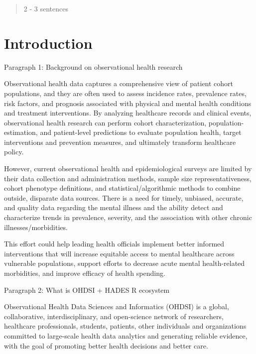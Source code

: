 \documentclass{juliacon}
\begin{document}


\maketitle

\begin{abstract}

2 - 3 sentences

\end{abstract}

\section{Introduction}

Paragraph 1: Background on observational health research

Observational health data captures a comprehensive view of patient cohort populations, and they are often used to assess incidence rates, prevalence rates, risk factors, and prognosis associated with physical and mental health conditions and treatment interventions. By analyzing healthcare records and clinical events, observational health research can perform cohort characterization, population-estimation, and patient-level predictions to evaluate population health, target interventions and prevention measures, and ultimately transform healthcare policy.    

However, current observational health and epidemiological surveys are limited by their data collection and administration methods, sample size representativeness, cohort phenotype definitions, and statistical/algorithmic methods to combine outside, disparate data sources. There is a need for timely, unbiased, accurate, and quality data regarding the mental illness and the ability detect and characterize trends in prevalence, severity, and the association with other chronic illnesses/morbidities. 

This effort could help leading health officials implement better informed interventions that will increase equitable access to mental healthcare across vulnerable populations, support efforts to decrease acute mental health-related morbidities, and improve efficacy of health spending. 

Paragraph 2: What is OHDSI + HADES R ecosystem

Observational Health Data Sciences and Informatics (OHDSI) is a global, collaborative, interdisciplinary, and open-science network of researchers, healthcare professionals, students, patients, other individuals and organizations committed to large-scale health data analytics and generating reliable evidence, with the goal of promoting better health decisions and better care. 
\end{document}
